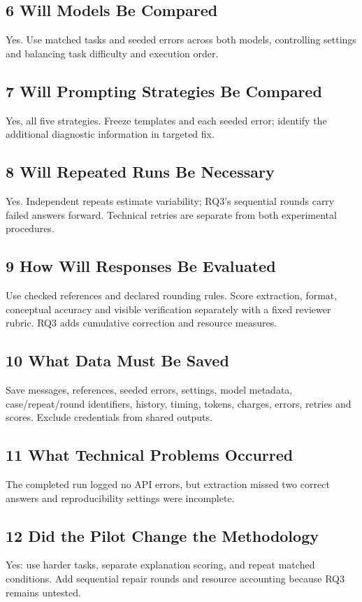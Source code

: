 \documentclass[11pt,letterpaper]{article}
\begin{document}
\subsection*{6 Will Models Be Compared}
Yes. Use matched tasks and seeded errors across both models, controlling settings and balancing task difficulty and execution order.

\subsection*{7 Will Prompting Strategies Be Compared}
Yes, all five strategies. Freeze templates and each seeded error; identify the additional diagnostic information in targeted fix.

\subsection*{8 Will Repeated Runs Be Necessary}
Yes. Independent repeats estimate variability; RQ3's sequential rounds carry failed answers forward. Technical retries are separate from both experimental procedures.

\subsection*{9 How Will Responses Be Evaluated}
Use checked references and declared rounding rules. Score extraction, format, conceptual accuracy and visible verification separately with a fixed reviewer rubric. RQ3 adds cumulative correction and resource measures.

\subsection*{10 What Data Must Be Saved}
Save messages, references, seeded errors, settings, model metadata, case/repeat/round identifiers, history, timing, tokens, charges, errors, retries and scores. Exclude credentials from shared outputs.

\subsection*{11 What Technical Problems Occurred}
The completed run logged no API errors, but extraction missed two correct answers and reproducibility settings were incomplete.

\subsection*{12 Did the Pilot Change the Methodology}
Yes: use harder tasks, separate explanation scoring, and repeat matched conditions. Add sequential repair rounds and resource accounting because RQ3 remains untested.
\end{document}
